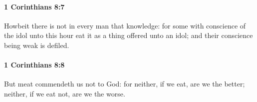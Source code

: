 		\paragraph{1 Corinthians 8:7} %
			\label{1CORINTHIANS-8-7}

			Howbeit there is not in every man that knowledge: for some with conscience of the idol unto this hour eat it as a thing offered unto an idol; and their conscience being weak is defiled.

			\begin{framed}
			\scriptsize
				\begin{compactdesc}
					\item[SBLG] 
				\end{compactdesc}
			\end{framed}

		\paragraph{1 Corinthians 8:8} %
			\label{1CORINTHIANS-8-8}

			But meat commendeth us not to God: for neither, if we eat, are we the better; neither, if we eat not, are we the worse.

